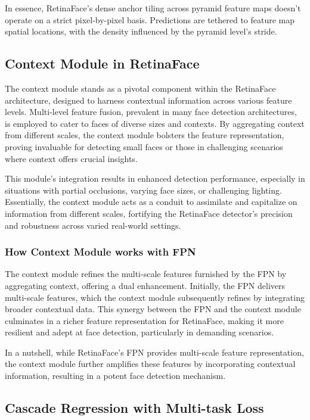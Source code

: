 \documentclass{article}
\begin{document}
In essence, RetinaFace's dense anchor tiling across pyramid feature maps doesn't operate on a strict pixel-by-pixel basis. Predictions are tethered to feature map spatial locations, with the density influenced by the pyramid level's stride.

\subsection{Context Module in RetinaFace}

The context module stands as a pivotal component within the RetinaFace architecture, designed to harness contextual information across various feature levels. Multi-level feature fusion, prevalent in many face detection architectures, is employed to cater to faces of diverse sizes and contexts. By aggregating context from different scales, the context module bolsters the feature representation, proving invaluable for detecting small faces or those in challenging scenarios where context offers crucial insights.

This module's integration results in enhanced detection performance, especially in situations with partial occlusions, varying face sizes, or challenging lighting. Essentially, the context module acts as a conduit to assimilate and capitalize on information from different scales, fortifying the RetinaFace detector's precision and robustness across varied real-world settings.

\subsubsection{How Context Module works with FPN}

The context module refines the multi-scale features furnished by the FPN by aggregating context, offering a dual enhancement. Initially, the FPN delivers multi-scale features, which the context module subsequently refines by integrating broader contextual data. This synergy between the FPN and the context module culminates in a richer feature representation for RetinaFace, making it more resilient and adept at face detection, particularly in demanding scenarios.

In a nutshell, while RetinaFace's FPN provides multi-scale feature representation, the context module further amplifies these features by incorporating contextual information, resulting in a potent face detection mechanism.

\subsection{Cascade Regression with Multi-task Loss}
\end{document}

